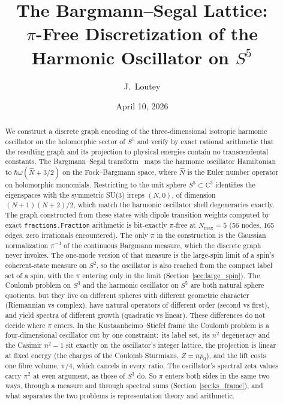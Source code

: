 \documentclass[twocolumn,pra,amsmath,amssymb,superscriptaddress]{revtex4-2}
\begin{document}
\title{The Bargmann--Segal Lattice:\\
$\pi$-Free Discretization of the Harmonic Oscillator on $S^5$}

\author{J.~Loutey}

\date{April 10, 2026}

\begin{abstract}
We construct a discrete graph encoding of the three-dimensional
isotropic harmonic oscillator on the holomorphic sector of $S^5$ and
verify by exact rational arithmetic that the resulting graph and its
projection to physical energies contain no transcendental constants.
The Bargmann--Segal transform~\cite{bargmann1961, hall1994} maps the
harmonic oscillator Hamiltonian to $\hbar\omega(\hat{N} + 3/2)$ on the
Fock--Bargmann space, where $\hat{N}$ is the Euler number operator on
holomorphic monomials. Restricting to the unit sphere $S^5 \subset
\mathbb{C}^3$ identifies the eigenspaces with the symmetric SU(3)
irreps $(N, 0)$, of dimension $(N+1)(N+2)/2$, which match the harmonic
oscillator shell degeneracies exactly.  The graph constructed from
these states with dipole transition weights computed by exact
\texttt{fractions.Fraction} arithmetic is bit-exactly $\pi$-free at
$N_{\max} = 5$ (56 nodes, 165 edges, zero irrationals encountered).
The only $\pi$ in the construction is the Gaussian normalization
$\pi^{-3}$ of the continuous Bargmann measure, which the discrete
graph never invokes.  The one-mode version of that measure is the
large-spin limit of a spin's coherent-state measure on $S^2$, so the
oscillator is also reached from the compact label set of a spin, with
the $\pi$ entering only in the limit (Section~\ref{sec:large_spin}).
The Coulomb problem on $S^3$ and the harmonic
oscillator on $S^5$ are both natural sphere quotients, but they live
on different spheres with different geometric character (Riemannian vs
complex), have natural operators of different order (second vs first),
and yield spectra of different growth (quadratic vs linear).  These
differences do not decide where $\pi$ enters.  In the
Kustaanheimo--Stiefel frame the Coulomb problem is a four-dimensional
oscillator cut by one constraint:\ its label set, its $n^2$ degeneracy
and the Casimir $n^2 - 1$ sit exactly on the oscillator's integer
lattice, the projection is linear at fixed energy (the charges of the
Coulomb Sturmians, $Z = n p_0$), and the lift costs one fibre volume,
$\pi/4$, which cancels in every ratio.  The oscillator's spectral zeta
values carry $\pi^2$ at even argument, as those of $S^3$ do.  So $\pi$
enters both sides in the same two ways, through a measure and through
spectral sums (Section~\ref{sec:ks_frame}), and what separates the two
problems is representation theory and arithmetic.
\end{abstract}
\end{document}
